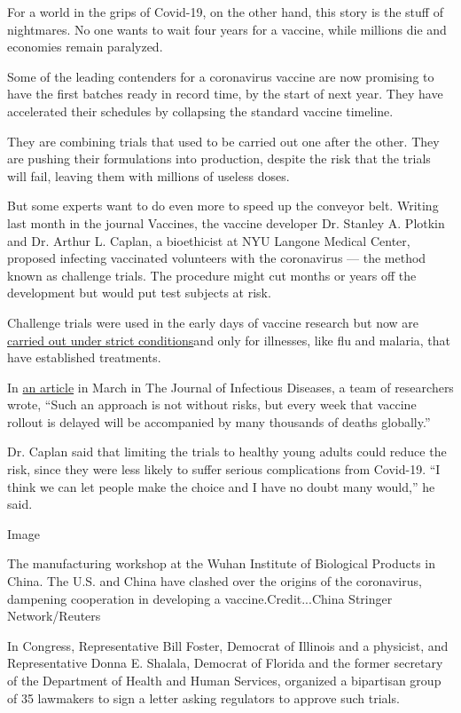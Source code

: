 For a world in the grips of Covid-19, on the other hand, this story is
the stuff of nightmares. No one wants to wait four years for a vaccine,
while millions die and economies remain paralyzed.

Some of the leading contenders for a coronavirus vaccine are now
promising to have the first batches ready in record time, by the start
of next year. They have accelerated their schedules by collapsing the
standard vaccine timeline.

They are combining trials that used to be carried out one after the
other. They are pushing their formulations into production, despite the
risk that the trials will fail, leaving them with millions of useless
doses.

But some experts want to do even more to speed up the conveyor belt.
Writing last month in the journal Vaccines, the vaccine developer Dr.
Stanley A. Plotkin and Dr. Arthur L. Caplan, a bioethicist at NYU
Langone Medical Center, proposed infecting vaccinated volunteers with
the coronavirus --- the method known as challenge trials. The procedure
might cut months or years off the development but would put test
subjects at risk.

Challenge trials were used in the early days of vaccine research but now
are
\href{https://www.nytimes3xbfgragh.onion/2020/04/30/opinion/coronavirus-vaccine-covid.html}{carried
out under strict conditions}and only for illnesses, like flu and
malaria, that have established treatments.

In
\href{https://dash.harvard.edu/bitstream/handle/1/42639016/jiaa152.pdf?sequence=4\&isAllowed=y}{an
article} in March in The Journal of Infectious Diseases, a team of
researchers wrote, ``Such an approach is not without risks, but every
week that vaccine rollout is delayed will be accompanied by many
thousands of deaths globally.''

Dr. Caplan said that limiting the trials to healthy young adults could
reduce the risk, since they were less likely to suffer serious
complications from Covid-19. ``I think we can let people make the choice
and I have no doubt many would,'' he said.

Image

The manufacturing workshop at the Wuhan Institute of Biological Products
in China. The U.S. and China have clashed over the origins of the
coronavirus, dampening cooperation in developing a
vaccine.Credit...China Stringer Network/Reuters

In Congress, Representative Bill Foster, Democrat of Illinois and a
physicist, and Representative Donna E. Shalala, Democrat of Florida and
the former secretary of the Department of Health and Human Services,
organized a bipartisan group of 35 lawmakers to sign a letter asking
regulators to approve such trials.

